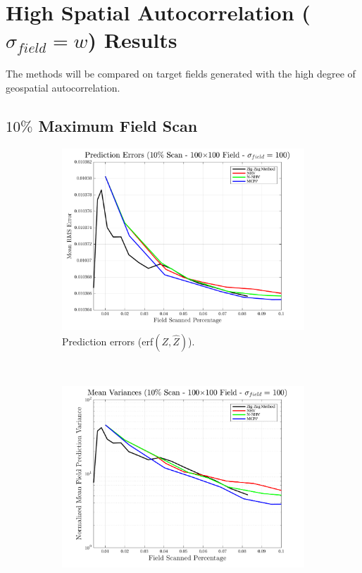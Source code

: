 \section{High Spatial Autocorrelation ($\sigma_{field} = w$) Results}
The methods will be compared on target fields generated with the high degree of geospatial autocorrelation.

\clearpage
\subsection{$10\%$ Maximum Field Scan}
\begin{figure}[htb!]
    \centering
    \begin{subfigure}[t]{0.65\textwidth}
        \centering
        \includegraphics[width=\linewidth]{figures/hbresults/pred_errs_10p_100x100_sf_100_seed_2.png}
        \captionsetup{skip=0.20\baselineskip,size=footnotesize}
        \caption{Prediction errors (erf$(Z,\hat{Z})$).}
        \label{fig:prederrs_sigma100_p10_s2}
    \end{subfigure}%
    \\
    \begin{subfigure}[t]{0.65\textwidth}
        \centering
        \includegraphics[width=\linewidth]{figures/hbresults/vars_10p_100x100_sf_100_seed_2.png}

\end{subfigure}
\end{figure}
